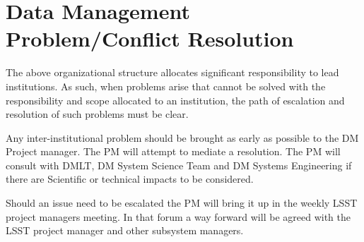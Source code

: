 \section{Data Management Problem/Conflict Resolution }
The above organizational structure allocates significant responsibility to lead institutions.  As such, when problems arise that cannot be solved with the responsibility and scope allocated to an institution, the path of escalation and resolution of such problems must be clear.

Any inter-institutional problem should be brought as early as possible to the DM Project manager. The PM will attempt to mediate a resolution. The PM will consult with DMLT, DM System Science Team and DM Systems Engineering if there are Scientific or technical impacts to be considered.

Should an issue need to be escalated the PM will bring it up in the weekly LSST project managers meeting.
In that forum a way forward will be agreed with the LSST project manager and other subsystem managers.

